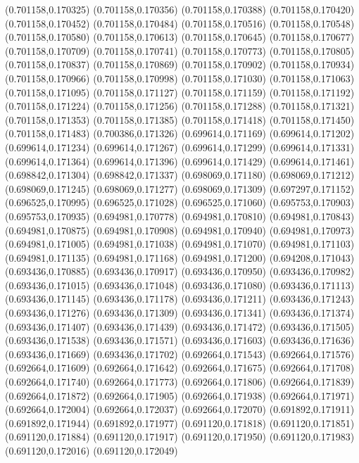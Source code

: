 (0.701158,0.170325)
(0.701158,0.170356)
(0.701158,0.170388)
(0.701158,0.170420)
(0.701158,0.170452)
(0.701158,0.170484)
(0.701158,0.170516)
(0.701158,0.170548)
(0.701158,0.170580)
(0.701158,0.170613)
(0.701158,0.170645)
(0.701158,0.170677)
(0.701158,0.170709)
(0.701158,0.170741)
(0.701158,0.170773)
(0.701158,0.170805)
(0.701158,0.170837)
(0.701158,0.170869)
(0.701158,0.170902)
(0.701158,0.170934)
(0.701158,0.170966)
(0.701158,0.170998)
(0.701158,0.171030)
(0.701158,0.171063)
(0.701158,0.171095)
(0.701158,0.171127)
(0.701158,0.171159)
(0.701158,0.171192)
(0.701158,0.171224)
(0.701158,0.171256)
(0.701158,0.171288)
(0.701158,0.171321)
(0.701158,0.171353)
(0.701158,0.171385)
(0.701158,0.171418)
(0.701158,0.171450)
(0.701158,0.171483)
(0.700386,0.171326)
(0.699614,0.171169)
(0.699614,0.171202)
(0.699614,0.171234)
(0.699614,0.171267)
(0.699614,0.171299)
(0.699614,0.171331)
(0.699614,0.171364)
(0.699614,0.171396)
(0.699614,0.171429)
(0.699614,0.171461)
(0.698842,0.171304)
(0.698842,0.171337)
(0.698069,0.171180)
(0.698069,0.171212)
(0.698069,0.171245)
(0.698069,0.171277)
(0.698069,0.171309)
(0.697297,0.171152)
(0.696525,0.170995)
(0.696525,0.171028)
(0.696525,0.171060)
(0.695753,0.170903)
(0.695753,0.170935)
(0.694981,0.170778)
(0.694981,0.170810)
(0.694981,0.170843)
(0.694981,0.170875)
(0.694981,0.170908)
(0.694981,0.170940)
(0.694981,0.170973)
(0.694981,0.171005)
(0.694981,0.171038)
(0.694981,0.171070)
(0.694981,0.171103)
(0.694981,0.171135)
(0.694981,0.171168)
(0.694981,0.171200)
(0.694208,0.171043)
(0.693436,0.170885)
(0.693436,0.170917)
(0.693436,0.170950)
(0.693436,0.170982)
(0.693436,0.171015)
(0.693436,0.171048)
(0.693436,0.171080)
(0.693436,0.171113)
(0.693436,0.171145)
(0.693436,0.171178)
(0.693436,0.171211)
(0.693436,0.171243)
(0.693436,0.171276)
(0.693436,0.171309)
(0.693436,0.171341)
(0.693436,0.171374)
(0.693436,0.171407)
(0.693436,0.171439)
(0.693436,0.171472)
(0.693436,0.171505)
(0.693436,0.171538)
(0.693436,0.171571)
(0.693436,0.171603)
(0.693436,0.171636)
(0.693436,0.171669)
(0.693436,0.171702)
(0.692664,0.171543)
(0.692664,0.171576)
(0.692664,0.171609)
(0.692664,0.171642)
(0.692664,0.171675)
(0.692664,0.171708)
(0.692664,0.171740)
(0.692664,0.171773)
(0.692664,0.171806)
(0.692664,0.171839)
(0.692664,0.171872)
(0.692664,0.171905)
(0.692664,0.171938)
(0.692664,0.171971)
(0.692664,0.172004)
(0.692664,0.172037)
(0.692664,0.172070)
(0.691892,0.171911)
(0.691892,0.171944)
(0.691892,0.171977)
(0.691120,0.171818)
(0.691120,0.171851)
(0.691120,0.171884)
(0.691120,0.171917)
(0.691120,0.171950)
(0.691120,0.171983)
(0.691120,0.172016)
(0.691120,0.172049)
